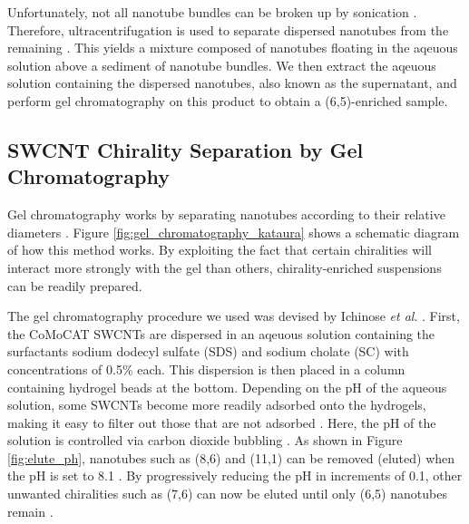 Unfortunately, not all nanotube bundles can be broken up by sonication \cite{o2002band}. Therefore, ultracentrifugation is used to separate dispersed nanotubes from the remaining  \cite{o2002band}. This yields a mixture composed of nanotubes floating in the aqeuous solution above a sediment of nanotube bundles. We then extract the aqeuous solution containing the dispersed nanotubes, also known as the supernatant, and perform gel chromatography on this product to obtain a (6,5)-enriched sample.

\subsection{SWCNT Chirality Separation by Gel Chromatography}

Gel chromatography works by separating nanotubes according to their relative diameters \cite{liu2011large}. Figure \ref{fig:gel_chromatography_kataura} shows a schematic diagram of how this method works. By exploiting the fact that certain chiralities will interact more strongly with the gel than others, chirality-enriched suspensions can be readily prepared.

The gel chromatography procedure we used was devised by Ichinose \textit{et al}. \cite{ichinose2017extraction}. First, the CoMoCAT SWCNTs are dispersed in an aqeuous solution containing the surfactants sodium dodecyl sulfate (SDS) and sodium cholate (SC) with concentrations of 0.5\% each. This dispersion is then placed in a column containing hydrogel beads at the bottom. Depending on the pH of the aqueous solution, some SWCNTs become more readily adsorbed onto the hydrogels, making it easy to filter out those that are not adsorbed \cite{liu2011large}. Here, the pH of the solution is controlled via carbon dioxide bubbling \cite{ichinose2017extraction}. As shown in Figure \ref{fig:elute_ph}, nanotubes such as (8,6) and (11,1) can be removed (eluted) when the pH is set to 8.1 \cite{ichinose2017extraction}. By progressively reducing the pH in increments of 0.1, other unwanted chiralities such as (7,6) can now be eluted until only (6,5) nanotubes remain \cite{ichinose2017extraction}.


